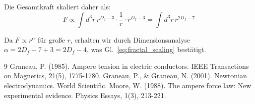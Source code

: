 	Die Gesamtkraft skaliert daher als:
	\begin{equation}
		F \propto \int d^3r \, r^{D_f - 3} \cdot \frac{1}{r} \cdot r^{D_f - 3} = \int d^3r \, r^{2D_f - 7}
	\end{equation}
	
	Da $F \propto r^{\alpha}$ für große $r$, erhalten wir durch Dimensionsanalyse $\alpha = 2D_f - 7 + 3 = 2D_f - 4$, was Gl.~\ref{eq:fractal_scaling} bestätigt.
	
	\begin{thebibliography}{9}
		 Graneau, P. (1985). Ampere tension in electric conductors. IEEE Transactions on Magnetics, 21(5), 1775-1780.
		 Graneau, P., \& Graneau, N. (2001). Newtonian electrodynamics. World Scientific.
		 Moore, W. (1988). The ampere force law: New experimental evidence. Physics Essays, 1(3), 213-221.
	\end{thebibliography}
	